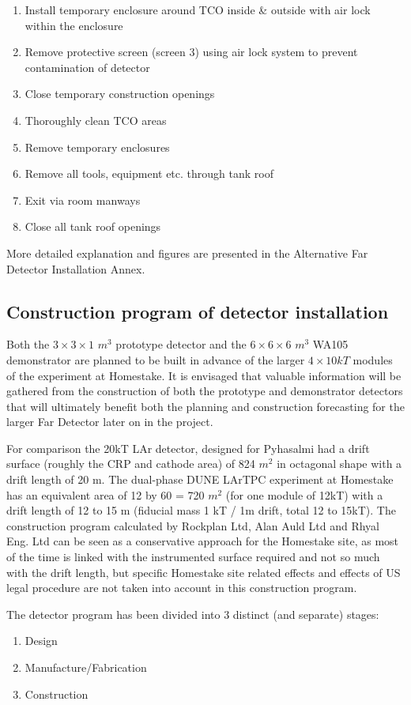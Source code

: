 \begin{enumerate}
\item{Install temporary enclosure around TCO inside \& outside with air lock within the enclosure}
\item{ Remove protective screen (screen 3) using air lock system to prevent contamination of detector}
\item{Close temporary construction openings}
\item{Thoroughly clean TCO areas}
\item{Remove temporary enclosures}
\item{Remove all tools, equipment etc. through tank roof}
\item{Exit via room manways}
\item{Close all tank roof openings}
\end{enumerate}
More detailed explanation and figures are presented in the Alternative
Far Detector Installation Annex.

\subsection{Construction program of detector installation}


Both the $3\times3\times1$ $m^3$ prototype detector and the $6\times
6\times 6$ $m^3$ WA105 demonstrator are planned to be built in advance
of the larger $4\times 10kT$ modules of the experiment at Homestake.
It is envisaged that valuable information will be gathered from the
construction of both the prototype and demonstrator detectors that
will ultimately benefit both the planning and construction forecasting
for the larger Far Detector later on in the project.

For comparison the 20kT LAr detector, designed for Pyhasalmi had a
drift surface (roughly the CRP and cathode area) of 824 $m^2$ in
octagonal shape with a drift length of 20 m. The dual-phase DUNE LArTPC
experiment at Homestake has an equivalent area of 12 by 60 = 720 $m^2$
(for one module of 12kT) with a drift length of 12 to 15 m (fiducial
mass 1 kT / 1m drift, total 12 to 15kT). The construction program
calculated by Rockplan Ltd, Alan Auld Ltd and Rhyal Eng. Ltd can be
seen as a conservative approach for the Homestake site, as most of the
time is linked with the instrumented surface required and not so much
with the drift length, but specific Homestake site related effects and
effects of US legal procedure are not taken into account in this
construction program.

The detector program has been divided into 3 distinct (and separate) stages:
\begin{enumerate}
\item{Design}
\item{Manufacture/Fabrication} 
\item{Construction}
\end{enumerate}  

